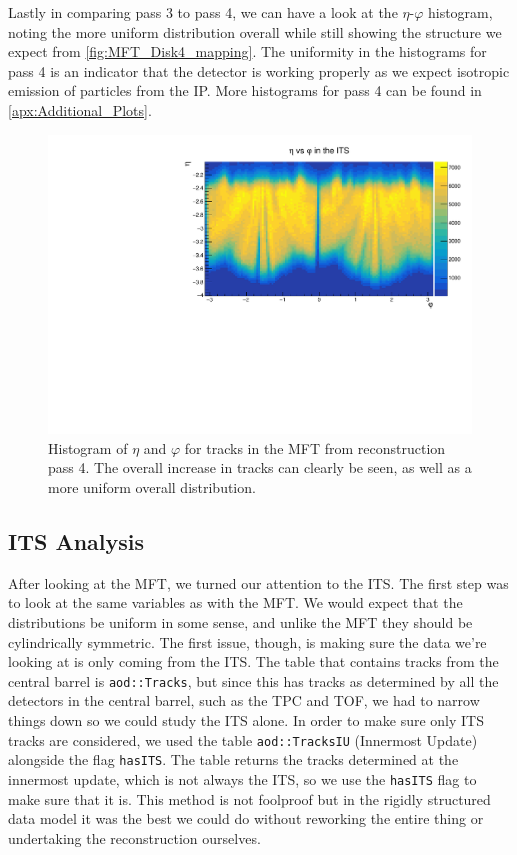 \bigskip

Lastly in comparing pass 3 to pass 4, we can have a look at the $\eta$-$\varphi$ histogram, noting the more uniform distribution overall while still showing the structure we expect from \cref{fig:MFT_Disk4_mapping}. The uniformity in the histograms for pass 4 is an indicator that the detector is working properly as we expect isotropic emission of particles from the IP. More histograms for pass 4 can be found in \cref{apx:Additional_Plots}.

\begin{figure}[h]
    \begin{center}
        \includegraphics[width=.8\textwidth]{Plots/pass4_MFT/eta_phi_pass4.pdf}
        \caption[$\eta$-$\varphi$ histogram for tracks from pass 4 in the MFT]{Histogram of $\eta$ and $\varphi$ for tracks in the MFT from reconstruction pass 4. The overall increase in tracks can clearly be seen, as well as a more uniform overall distribution.}
        \label{fig:eta_phi_pass4}
    \end{center}
\end{figure}

\subsection{ITS Analysis}
After looking at the MFT, we turned our attention to the ITS. The first step was to look at the same variables as with the MFT. We would expect that the distributions be uniform in some sense, and unlike the MFT they should be cylindrically symmetric. The first issue, though, is making sure the data we're looking at is only coming from the ITS. The table that contains tracks from the central barrel is \texttt{aod::Tracks}, but since this has tracks as determined by all the detectors in the central barrel, such as the TPC and TOF, we had to narrow things down so we could study the ITS alone. In order to make sure only ITS tracks are considered, we used the table \texttt{aod::TracksIU} (Innermost Update) alongside the flag \texttt{hasITS}. The table returns the tracks determined at the innermost update, which is not always the ITS, so we use the \texttt{hasITS} flag to make sure that it is. This method is not foolproof but in the rigidly structured data model it was the best we could do without reworking the entire thing or undertaking the reconstruction ourselves.

